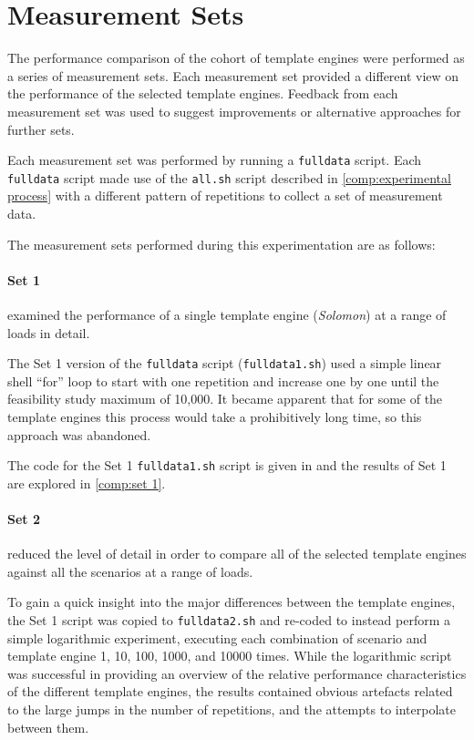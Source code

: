 \section{Measurement Sets}
\label{fs2:sets}

The performance comparison of the cohort of \gls{template engine}s were performed as a series of measurement sets. Each measurement set provided a different view on the performance of the selected \gls{template engine}s. Feedback from each measurement set was used to suggest improvements or alternative approaches for further sets.

Each measurement set was performed by running a \texttt{fulldata} script. Each \texttt{fulldata} script made use of the \texttt{all.sh} script described in \autoref{comp:experimental process} with a different pattern of repetitions to collect a set of measurement data.

The measurement sets performed during this experimentation are as follows:

\paragraph{Set 1} examined the performance of a single template engine (\emph{Solomon}) at a range of loads in detail.

The Set 1 version of the \texttt{fulldata} script (\texttt{fulldata1.sh}) used a simple linear shell \enquote{for} loop to start with one repetition and increase one by one until the feasibility study maximum of 10,000. It became apparent that for some of the \gls{template engine}s this process would take a prohibitively long time, so this approach was abandoned.

The code for the Set 1 \texttt{fulldata1.sh} script is given in  and the results of Set 1 are explored in \autoref{comp:set 1}.

\paragraph{Set 2} reduced the level of detail in order to compare all of the selected template engines against all the scenarios at a range of loads.

To gain a quick insight into the major differences between the \gls{template engine}s, the Set 1 script was copied to \texttt{fulldata2.sh} and re-coded to instead perform a simple logarithmic experiment, executing each combination of scenario and \gls{template engine} 1, 10, 100, 1000, and 10000 times. While the logarithmic script was successful in providing an overview of the relative performance characteristics of the different \gls{template engine}s, the results contained obvious artefacts related to the large jumps in the number of repetitions, and the attempts to interpolate between them.

